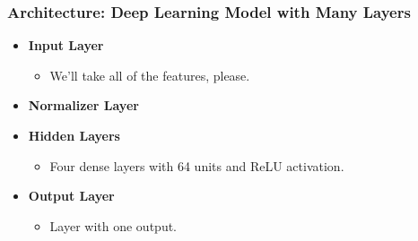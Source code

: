 \documentclass[11pt]{article}
\providecommand{\tightlist}{%
      \setlength{\itemsep}{0pt}\setlength{\parskip}{0pt}}
\begin{document}
\subsubsection{Architecture: Deep Learning Model with Many
Layers}\label{architecture-deep-learning-model-with-many-layers}

\begin{itemize}
\tightlist
\item
  \textbf{Input Layer}

  \begin{itemize}
  \tightlist
  \item
    We'll take all of the features, please.
  \end{itemize}
\item
  \textbf{Normalizer Layer}
\item
  \textbf{Hidden Layers}

  \begin{itemize}
  \tightlist
  \item
    Four dense layers with 64 units and ReLU activation.
  \end{itemize}
\item
  \textbf{Output Layer}

  \begin{itemize}
  \tightlist
  \item
    Layer with one output.
  \end{itemize}
\end{itemize}
\end{document}

